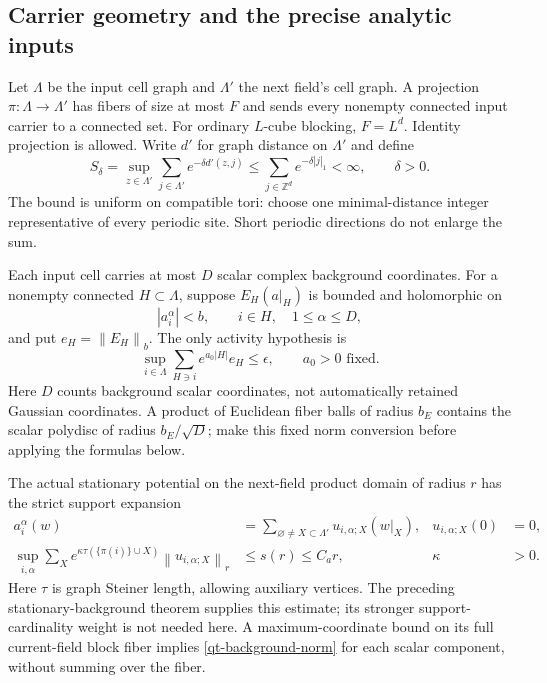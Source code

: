 \documentclass[11pt]{article}
\theoremstyle{remark}
\newcommand{\norm}[1]{\left\|#1\right\|}
\begin{document}
\subsection{Carrier geometry and the precise analytic inputs}
\label{qt-input-section}

Let $\Lambda$ be the input cell graph and $\Lambda'$ the next field's
cell graph. A projection $\pi:\Lambda\to\Lambda'$ has fibers of size
at most $F$ and sends every nonempty connected input carrier to a
connected set. For ordinary $L$-cube blocking, $F=L^d$. Identity
projection is allowed. Write $d'$ for graph distance on $\Lambda'$ and
define
\begin{equation}\label{qt-distance-sum}
 S_\delta=\sup_{z\in\Lambda'}\sum_{j\in\Lambda'}e^{-\delta d'(z,j)}
 \le\sum_{j\in\mathbb Z^d}e^{-\delta|j|_1}<\infty,
 \qquad \delta>0.
\end{equation}
The bound is uniform on compatible tori: choose one minimal-distance
integer representative of every periodic site. Short periodic
directions do not enlarge the sum.

Each input cell carries at most $D$ scalar complex background
coordinates. For a nonempty connected $H\subset\Lambda$, suppose
$E_H(a|_H)$ is bounded and holomorphic on
\begin{equation}\label{qt-input-domain}
 |a_i^\alpha|<b,\qquad i\in H,\quad 1\le\alpha\le D,
\end{equation}
and put $e_H=\norm{E_H}_b$. The only activity hypothesis is
\begin{equation}\label{qt-input-norm}
 \sup_{i\in\Lambda}\sum_{H\ni i}e^{a_0|H|}e_H\le\epsilon,
 \qquad a_0>0\text{ fixed}.
\end{equation}
Here $D$ counts background scalar coordinates, not automatically
retained Gaussian coordinates. A product of Euclidean fiber balls of
radius $b_E$ contains the scalar polydisc of radius $b_E/\sqrt D$;
make this fixed norm conversion before applying the formulas below.

The actual stationary potential on the next-field product domain of
radius $r$ has the strict support expansion
\begin{align}
 a_i^\alpha(w)&=\sum_{\varnothing\ne X\subset\Lambda'}
                   u_{i,\alpha;X}(w|_X),
 &u_{i,\alpha;X}(0)&=0,                                  \label{qt-background-series}\\
 \sup_{i,\alpha}\sum_X
 e^{\kappa\tau(\{\pi(i)\}\cup X)}
       \norm{u_{i,\alpha;X}}_r&\le s(r)\le C_a r,
 &\kappa&>0.                                             \label{qt-background-norm}
\end{align}
Here $\tau$ is graph Steiner length, allowing auxiliary vertices.
The preceding stationary-background theorem supplies this estimate;
its stronger support-cardinality weight is not needed here. A
maximum-coordinate bound on its full current-field block fiber
implies \eqref{qt-background-norm} for each scalar component, without
summing over the fiber.
\end{document}
